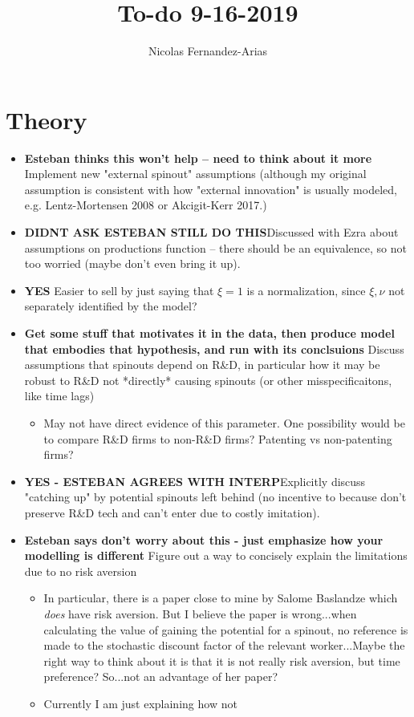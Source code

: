 \documentclass[12pt,english]{article}
\theoremstyle{remark}
\begin{document}
	
\title{To-do 9-16-2019}
\author{Nicolas Fernandez-Arias}
\maketitle

\section{Theory}

\begin{itemize}
	\item \textbf{Esteban thinks this won't help -- need to think about it more} Implement new "external spinout" assumptions (although my original assumption is consistent with how "external innovation" is usually modeled, e.g. Lentz-Mortensen 2008 or Akcigit-Kerr 2017.)
	\item \textbf{DIDNT ASK ESTEBAN STILL DO THIS}Discussed with Ezra about assumptions on productions function -- there should be an equivalence, so not too worried (maybe don't even bring it up).
	\item \textbf{YES} Easier to sell by just saying that $\xi = 1$ is a normalization, since $\xi,\nu$ not separately identified by the model?
	\item \textbf{Get some stuff that motivates it in the data, then produce model that embodies that hypothesis, and run with its conclsuions} Discuss assumptions that spinouts depend on R\&D, in particular how it may be robust to R\&D not *directly* causing spinouts (or other misspecificaitons, like time lags)
	\begin{itemize}
		\item May not have direct evidence of this parameter. One possibility would be to compare R\&D firms to non-R\&D firms? Patenting vs non-patenting firms?
	\end{itemize}
	\item \textbf{YES - ESTEBAN AGREES WITH INTERP}Explicitly discuss "catching up" by potential spinouts left behind (no incentive to because don't preserve R\&D tech and can't enter due to costly imitation).
	\item \textbf{Esteban says don't worry about this - just emphasize how your modelling is different} Figure out a way to concisely explain the limitations due to no risk aversion
	\begin{itemize}
		\item In particular, there is a paper close to mine by Salome Baslandze which \textit{does} have risk aversion. But I believe the paper is wrong...when calculating the value of gaining the potential for a spinout, no reference is made to the stochastic discount factor of the relevant worker...Maybe the right way to think about it is that it is not really risk aversion, but time preference? So...not an advantage of her paper? 
		\item Currently I am just explaining how not 
	\end{itemize}
\end{itemize}
\end{document}
